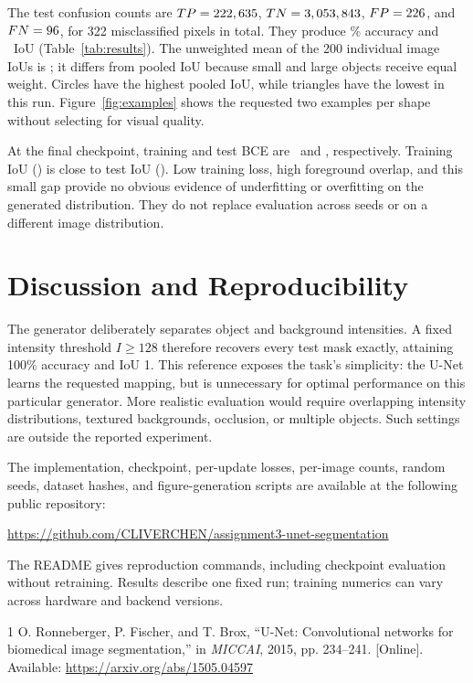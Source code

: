\documentclass[conference]{IEEEtran}
\begin{document}
The test confusion counts are $TP=222,635$, $TN=3,053,843$, $FP=226$, and $FN=96$, for 322 misclassified pixels in total. They produce \TestAcc\% accuracy and \TestIoU\ IoU (Table~\ref{tab:results}). The unweighted mean of the 200 individual image IoUs is \MeanIoU; it differs from pooled IoU because small and large objects receive equal weight. Circles have the highest pooled IoU, while triangles have the lowest in this run. Figure~\ref{fig:examples} shows the requested two examples per shape without selecting for visual quality.

At the final checkpoint, training and test BCE are \TrainBCE\ and \TestBCE, respectively. Training IoU (\TrainIoU) is close to test IoU (\TestIoU). Low training loss, high foreground overlap, and this small gap provide no obvious evidence of underfitting or overfitting on the generated distribution. They do not replace evaluation across seeds or on a different image distribution.

\section{Discussion and Reproducibility}
The generator deliberately separates object and background intensities. A fixed intensity threshold $I\geq128$ therefore recovers every test mask exactly, attaining 100\% accuracy and IoU 1. This reference exposes the task's simplicity: the U-Net learns the requested mapping, but is unnecessary for optimal performance on this particular generator. More realistic evaluation would require overlapping intensity distributions, textured backgrounds, occlusion, or multiple objects. Such settings are outside the reported experiment.

The implementation, checkpoint, per-update losses, per-image counts, random seeds, dataset hashes, and figure-generation scripts are available at the following public repository:
\begin{center}
\small\url{https://github.com/CLIVERCHEN/assignment3-unet-segmentation}
\end{center}
The README gives reproduction commands, including checkpoint evaluation without retraining. Results describe one fixed run; training numerics can vary across hardware and backend versions.

\begin{thebibliography}{1}
 O. Ronneberger, P. Fischer, and T. Brox, ``U-Net: Convolutional networks for biomedical image segmentation,'' in \emph{MICCAI}, 2015, pp. 234--241. [Online]. Available: \url{https://arxiv.org/abs/1505.04597}
\end{thebibliography}
\end{document}
